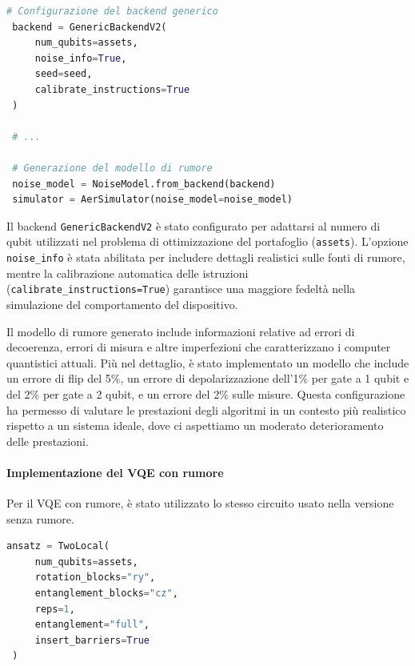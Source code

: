 \begin{lstlisting}[language=python, caption={Configurazione del modello di rumore per la simulazione.}]
 # Configurazione del backend generico
 backend = GenericBackendV2(
     num_qubits=assets, 
     noise_info=True,
     seed=seed,
     calibrate_instructions=True
 )
 
 # ...
 
 # Generazione del modello di rumore
 noise_model = NoiseModel.from_backend(backend)
 simulator = AerSimulator(noise_model=noise_model)
\end{lstlisting}

Il backend \texttt{GenericBackendV2} è stato configurato per adattarsi al numero 
di qubit utilizzati nel problema di ottimizzazione del portafoglio (\texttt{assets}). 
L'opzione \texttt{noise\_info} è stata abilitata per includere dettagli realistici 
sulle fonti di rumore, mentre la calibrazione automatica delle istruzioni 
(\texttt{calibrate\_instructions=True}) garantisce una maggiore fedeltà nella 
simulazione del comportamento del dispositivo.

Il modello di rumore generato include informazioni relative ad errori di decoerenza, 
errori di misura e altre imperfezioni che caratterizzano i computer quantistici 
attuali. Più nel dettaglio, è stato implementato un modello che include un errore 
di flip del 5\%, un errore di depolarizzazione dell'1\% per gate a 1 qubit e del 2\%
per gate a 2 qubit, e un errore del 2\% sulle misure. Questa configurazione ha 
permesso di valutare le prestazioni degli algoritmi in un contesto più realistico 
rispetto a un sistema ideale, dove ci aspettiamo un moderato deterioramento delle 
prestazioni.



\paragraph{Implementazione del VQE con rumore} 

Per il VQE con rumore, è stato utilizzato lo stesso circuito usato nella versione senza rumore.

\begin{lstlisting}[language=python, caption={Configurazione dell'ansatz per il VQE.}]
 ansatz = TwoLocal(
     num_qubits=assets,
     rotation_blocks="ry",
     entanglement_blocks="cz",
     reps=1,
     entanglement="full",
     insert_barriers=True
 )
\end{lstlisting}

